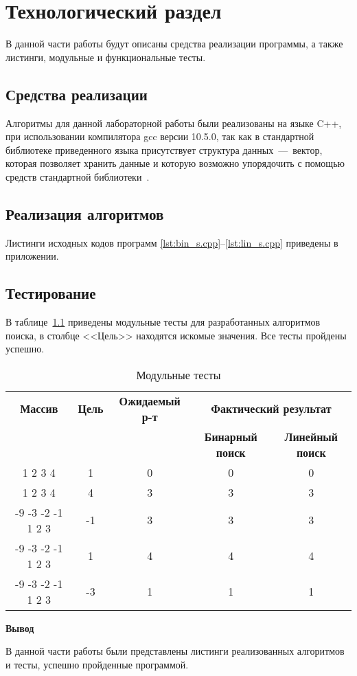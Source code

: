 \chapter{Технологический раздел}

В данной части работы будут описаны средства реализации программы, а также листинги, модульные и функциональные тесты.

\section{Средства реализации}
Алгоритмы для данной лабораторной работы были реализованы на языке C++, при использовании компилятора gcc версии 10.5.0, так как в стандартной библиотеке приведенного языка
присутствует структура данных~---~вектор, которая позволяет хранить данные и которую возможно упорядочить с помощью средств стандартной библиотеки~\cite{cpp-vec}.



\section{Реализация алгоритмов}
Листинги исходных кодов программ  \ref{lst:bin_s.cpp}--\ref{lst:lin_s.cpp} приведены в приложении.


\section{Тестирование}

В таблице~\ref{t:mod_tests} приведены модульные тесты для разработанных алгоритмов поиска, в столбце <<Цель>> находятся искомые значения. Все тесты пройдены успешно.
\begin{table}[ht]
	\small
	\begin{center}
		\begin{threeparttable}
			\caption{Модульные тесты}
			\label{t:mod_tests}
			\begin{tabular}{|c|c|c|c|c|}
				\hline
				\bfseries Массив
				& \bfseries Цель
				& \bfseries Ожидаемый р-т
				& \multicolumn{2}{c|}{\bfseries Фактический результат} \\ \cline{4-5}
				& & & \bfseries Бинарный поиск & \bfseries Линейный поиск \\
				\hline
				1 2 3 4  & 1 & 0 &0 & 0 \\
				\hline
				1 2 3 4 & 4 & 3 & 3 & 3 \\
				\hline
				-9 -3 -2 -1 1 2 3 & -1 & 3  & 3 & 3 \\
				\hline
				-9 -3 -2 -1 1 2 3 & 1 & 4  & 4 & 4 \\
				\hline
				-9 -3 -2 -1 1 2 3 & -3 & 1  & 1 & 1 \\
				\hline
			\end{tabular}	
		\end{threeparttable}	
	\end{center}
\end{table}

\textbf{Вывод}

В данной части работы были представлены листинги реализованных алгоритмов и тесты, успешно пройденные программой.